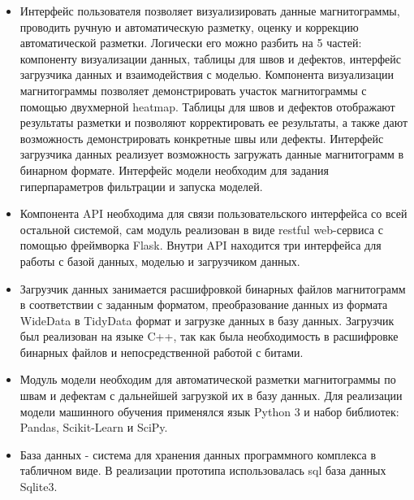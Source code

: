 \documentclass[a4paper,article,14pt]{extarticle}
\begin{document}
\begin{itemize}
    \item Интерфейс пользователя позволяет визуализировать данные магнитограммы, проводить ручную и автоматическую разметку, оценку и коррекцию автоматической разметки. Логически его можно разбить на 5 частей: компоненту визуализации данных, таблицы для швов и дефектов, интерфейс загрузчика данных и взаимодействия с моделью. Компонента визуализации магнитограммы позволяет демонстрировать участок магнитограммы с помощью двухмерной heatmap. Таблицы для швов и дефектов отображают результаты разметки и позволяют корректировать ее результаты, а также дают возможность демонстрировать конкретные швы или дефекты. Интерфейс загрузчика данных реализует возможность загружать данные магнитограмм в бинарном формате. Интерфейс модели необходим для задания гиперпараметров фильтрации и запуска моделей.
    \item Компонента API необходима для связи пользовательского интерфейса со всей остальной системой, сам модуль реализован в виде restful web-сервиса с помощью  фреймворка Flask. Внутри API находится три интерфейса для работы с базой данных, моделью и загрузчиком данных.
    \item Загрузчик данных занимается расшифровкой бинарных файлов магнитограмм в соответствии с заданным форматом, преобразование данных из формата WideData в TidyData формат  и загрузке данных в базу данных. Загрузчик был реализован на языке C++, так как была необходимость в расшифровке бинарных файлов и непосредственной работой с битами.
    \item Модуль модели необходим для автоматической разметки магнитограммы по швам и дефектам с дальнейшей загрузкой их в базу данных. Для реализации модели машинного обучения применялся язык Python 3 и набор библиотек: Pandas, Scikit-Learn и SciPy.
    \item База данных - система для хранения данных программного комплекса в табличном виде. В реализации прототипа использовалась sql база данных Sqlite3. 
\end{itemize}
\end{document}
